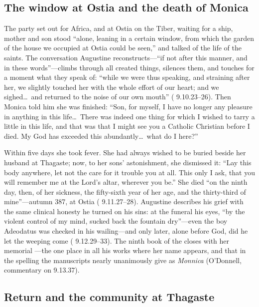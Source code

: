 \subsection{The window at Ostia and the death of Monica}

The party set out for Africa, and at Ostia on the Tiber, waiting for a ship,
mother and son stood ``alone, leaning in a certain window, from which the
garden of the house we occupied at Ostia could be seen,'' and talked of the
life of the saints. The conversation Augustine reconstructs---``if not after
this manner, and in these words''---climbs through all created things,
silences them, and touches for a moment what they speak of: ``while we were
thus speaking, and straining after her, we slightly touched her with the
whole effort of our heart; and we sighed\ldots\ and returned to the noise of
our own mouth'' ( 9.10.23--26). Then Monica told him she
was finished: ``Son, for myself, I have no longer any pleasure in anything
in this life\ldots\ There was indeed one thing for which I wished to tarry a
little in this life, and that was that I might see you a Catholic Christian
before I died. My God has exceeded this abundantly\ldots\ what do I here?''

Within five days she took fever. She had always wished to be buried beside
her husband at Thagaste; now, to her sons' astonishment, she dismissed it:
``Lay this body anywhere, let not the care for it trouble you at all. This
only I ask, that you will remember me at the Lord's altar, wherever you
be.'' She died ``on the ninth day, then, of her sickness, the fifty-sixth
year of her age, and the thirty-third of mine''---autumn 387, at Ostia
( 9.11.27--28). Augustine describes his grief with the
same clinical honesty he turned on his sins: at the funeral his eyes, ``by
the violent control of my mind, sucked back the fountain dry''---even the
boy Adeodatus was checked in his wailing---and only later, alone before God,
did he let the weeping come ( 9.12.29--33). The ninth book
of the  closes with her memorial
---the one place in all his works where her name appears, and that in the
spelling the manuscripts nearly unanimously give as \textit{Monnica}
(O'Donnell, commentary on  9.13.37).

\subsection{Return and the community at Thagaste}

